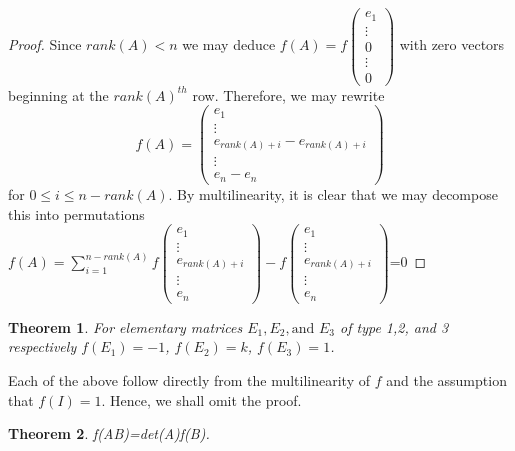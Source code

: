 \documentclass{article}
\newtheorem{thm}{Theorem}
\begin{document}
\begin{proof}
Since $rank(A)<n$ we may deduce $f(A)=f\begin{pmatrix}e_1 \\ \vdots \\ 0 \\ \vdots \\ 0\end{pmatrix}$ with zero vectors beginning at the $rank(A)^{th}$ row. Therefore, we may rewrite $$f(A)=\begin{pmatrix}e_1 \\ \vdots \\ e_{rank(A)+i} - e_{rank(A)+i} \\ \vdots \\ e_n-e_n \end{pmatrix}$$ for $0 \leq i \leq n-rank(A)$. By multilinearity, it is clear that we may decompose this into permutations $f(A)=\sum\limits_{i=1}^{n-rank(A)}f\begin{pmatrix}e_1 \\ \vdots \\ e_{rank(A)+i} \\ \vdots \\ e_n \end{pmatrix}-f\begin{pmatrix}e_1 \\ \vdots \\  e_{rank(A)+i} \\ \vdots \\ e_n \end{pmatrix}$=0
	
\end{proof}
\begin{thm}
	For elementary matrices $E_1, E_2, \text{and } E_3$ of type 1,2, and 3 respectively $f(E_1)=-1$, $f(E_2)=k$,  $f(E_3)=1$.
\end{thm}
Each of the above follow directly from the multilinearity of $f$ and the assumption that $f(I)=1$. Hence, we shall omit the proof.
\begin{thm}
f(AB)=det(A)f(B).	
\end{thm}
\end{document}
